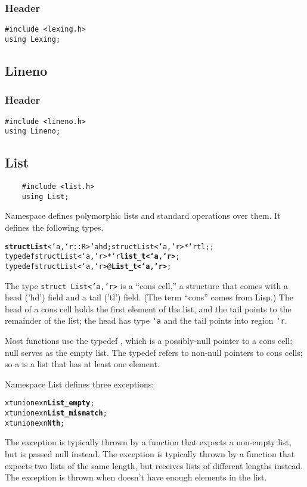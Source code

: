 \subsubsection*{Header}
\begin{verbatim}
#include <lexing.h>
using Lexing;
\end{verbatim}

\subsection{Lineno}

\subsubsection*{Header}
\begin{verbatim}
#include <lineno.h>
using Lineno;
\end{verbatim}

\subsection{List}

\begin{verbatim}
    #include <list.h>
    using List;
\end{verbatim}

Namespace  defines polymorphic lists and standard operations
over them.  It defines the following types.

\begin{alltt}
    \textbf{struct List}<`a,`r::R> \lb`a hd; struct List<`a,`r> *`r tl;\rb;
    typedef struct List<`a,`r> *`r \textbf{list_t<`a,`r>};
    typedef struct List<`a,`r> @\textbf{List_t<`a,`r>};
\end{alltt}

The type \texttt{struct List<`a,`r>} is a ``cons cell,'' a structure
that comes with a head ('hd') field and a tail ('tl') field.  (The
term ``cons'' comes from Lisp.)  The head of a cons cell holds the
first element of the list, and the tail points to the remainder of the
list; the head has type \texttt{`a} and the tail points into region
\texttt{`r}.

Most functions use the typedef , which is a possibly-null
pointer to a cons cell; null serves as the empty list.  The typedef
 refers to non-null pointers to cons cells; so a
 is a list that has at least one element.

Namespace List defines three exceptions:
\begin{alltt}
    xtunion exn \lb \textbf{List_empty} \rb;
    xtunion exn \lb \textbf{List_mismatch} \rb;
    xtunion exn \lb \textbf{Nth} \rb;
\end{alltt}
The  exception is typically thrown by a function that
expects a non-empty list, but is passed null instead.  The
 exception is typically thrown by a function that
expects two lists of the same length, but receives lists of different
lengths instead.  The  exception is thrown when
 doesn't have enough elements in the list.

